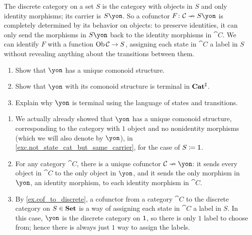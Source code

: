 \documentclass[Book-Poly]{subfiles}
\begin{document}
\begin{example} \label{ex.cof_to_discrete}
The discrete category on a set $S$ is the category with objects in $S$ and only identity morphisms; its carrier is $S\yon$.
So a cofunctor $F\colon\cat C\cof S\yon$ is completely determined by its behavior on objects: to preserve identities, it can only send the morphisms in $S\yon$ back to the identity morphisms in $\cat C$.
We can identify $F$ with a function $\operatorname{Ob}\mathcal{C}\to S$, assigning each state in $\cat C$ a label in $S$ without revealing anything about the transitions between them.
\end{example}

\begin{exercise}
\begin{enumerate}
	\item Show that $\yon$ has a unique comonoid structure.
	\item Show that $\yon$ with its comonoid structure is terminal in $\mathbf{Cat}^\sharp$.
	\item Explain why $\yon$ is terminal using the language of states and transitions.
\qedhere
\end{enumerate}
\begin{solution}
\begin{enumerate}
    \item We actually already showed that $\yon$ has a unique comonoid structure, corresponding to the category with $1$ object and no nonidentity morphisms (which we will also denote by $\yon$), in \cref{exc.not_state_cat_but_same_carrier}, for the case of $S\coloneqq\textsf{1}$.
    \item For any category $\cat{C}$, there is a unique cofunctor $\cat{C}\cof\yon$: it sends every object in $\cat{C}$ to the only object in $\yon$, and it sends the only morphism in $\yon$, an identity morphism, to each identity morphism in $\cat{C}$.
    \item By \cref{ex.cof_to_discrete}, a cofunctor from a category $\cat C$ to the discrete category on $S\in\mathbf{Set}$ is a way of assigning each state in $\cat C$ a label in $S$.
    In this case, $\yon$ is the discrete category on $\textsf{1}$, so there is only $1$ label to choose from; hence there is always just $1$ way to assign the labels.
\end{enumerate}
\end{solution}
\end{exercise}
\end{document}
